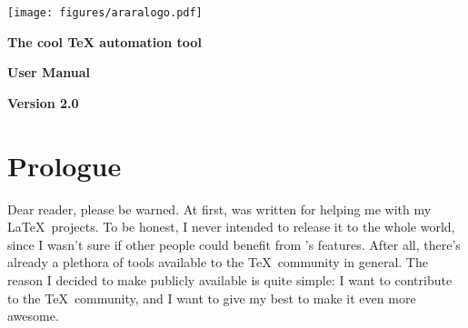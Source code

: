 \documentclass[a4paper,twoside,12pt]{memoir}
\newcommand{\araraversion}{2.0}
\begin{document}
\begin{titlingpage}

\begin{center}
\vspace*{3em}

\texttt{[image: figures/araralogo.pdf]}

\vspace{2em}

{\color{araracolor}\bfseries\Huge The cool \TeX{} automation tool}

\vspace{15em}

\begin{mdframed}[innertopmargin=10pt,innerbottommargin=10pt,innerleftmargin=10pt,
                 innerrightmargin=10pt,roundcorner=5pt,linecolor=araracolor,
                 middlelinewidth=2pt]
{\color{araracolor}\bfseries\Huge\Forward\hfill User Manual}
\end{mdframed}

\vfill

{\color{araracolor}\bfseries\LARGE Version \araraversion}

\end{center}

\end{titlingpage}

\frontmatter
{}
\pagestyle{araraheadings}
\nouppercaseheads

\chapter*{Prologue}
\label{chap:prologue}

Dear reader, please be warned. At first, \arara was written for helping me with
my \LaTeX\ projects. To be honest, I never intended to release it to the whole 
world, since I wasn't sure if other people could benefit from \arara's features.
After all, there's already a plethora of tools available to the \TeX\ community
in general. The reason I decided to make \arara publicly available is quite 
simple: I want to contribute to the \TeX\ community, and I want to give my best
to make it even more awesome.
\end{document}
